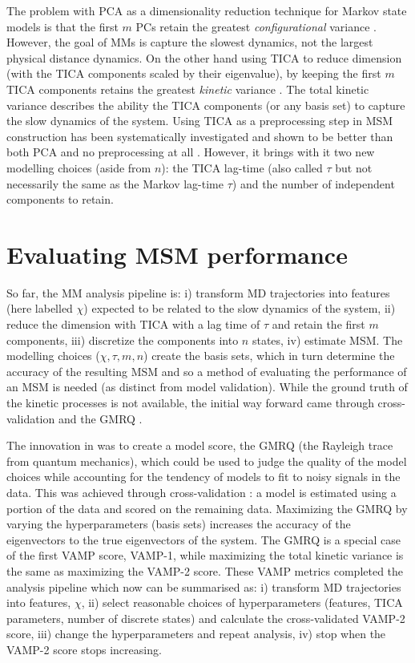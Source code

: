 The problem with PCA as a dimensionality reduction technique for Markov state models is that the first $m$ PCs retain the greatest \emph{configurational} variance \cite{friedman2001elements}. However, the goal of MMs is capture the slowest dynamics, not the largest physical distance dynamics. On the other hand using TICA to reduce dimension (with the TICA components scaled by their eigenvalue), by keeping the first $m$ TICA components retains the greatest \emph{kinetic} variance \cite{noeKineticDistanceKinetic2015}. The total kinetic variance describes the ability  the TICA components (or any basis set) to capture the slow dynamics of the system. Using TICA as a preprocessing step in MSM construction has been systematically investigated and shown to be better than both PCA and no preprocessing at all \cite{husicOptimizedParameterSelection2016}. However, it brings with it two new modelling choices (aside from $n$): the TICA lag-time (also called $\tau$ but not necessarily the same as the Markov lag-time $\tau$) and the number of independent components to retain.  

\section{Evaluating MSM performance}\label{sec:intro_msm_perf}
So far, the MM analysis pipeline is: i) transform MD trajectories into features (here labelled $\chi$) expected to be related to the slow dynamics of the system, ii) reduce the dimension with TICA with a lag time of $\tau$ and retain the first $m$ components, iii) discretize the components into $n$ states, iv) estimate MSM. The modelling choices ($\chi, \tau, m, n$) create the basis sets, which in turn determine the accuracy of the resulting MSM and so a method of evaluating the performance of an MSM is needed (as distinct from model validation). While the ground truth of the kinetic processes is not available, the initial way forward came through cross-validation and the GMRQ \cite{mcgibbonVariationalCrossvalidationSlow2015}. 

The innovation in \cite{mcgibbonVariationalCrossvalidationSlow2015} was to create a model score, the GMRQ (the Rayleigh trace from quantum mechanics), which could be used to judge the quality of the model choices while accounting for the tendency of models to fit to noisy signals in the data. This was achieved through cross-validation \cite{arlotSurveyCrossvalidationProcedures2009}: a model is estimated using a portion of the data and scored on the remaining data. Maximizing the GMRQ by varying the hyperparameters (basis sets) increases the accuracy of the eigenvectors to the true eigenvectors of the system. The GMRQ is a special case of the first VAMP score, VAMP-1, while maximizing the total kinetic variance is the same as maximizing the VAMP-2 score. These VAMP metrics completed the analysis pipeline \cite{schererVariationalSelectionFeatures2019} which now can be summarised as: i) transform MD trajectories into features, $\chi$, ii) select reasonable choices of  hyperparameters (features, TICA parameters, number of discrete states) and calculate the cross-validated VAMP-2 score, iii) change the hyperparameters and repeat analysis, iv) stop when the VAMP-2 score stops increasing. 

